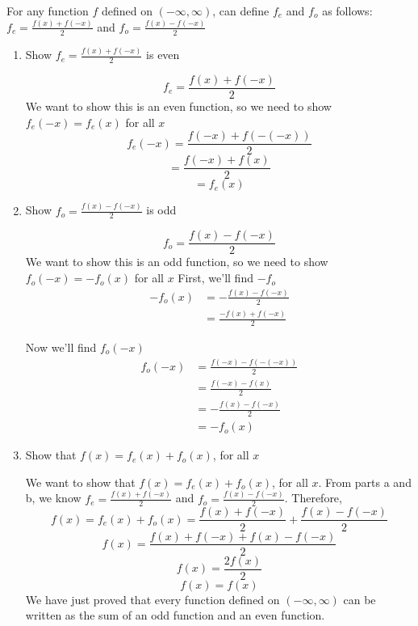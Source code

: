 \documentclass[nooutcomes, noinstructornotes]{ximera}
\begin{document}
\begin{problem}
For any function $f$ defined on $(-\infty,\infty)$, can define $f_e$ and $f_o$ as follows: $f_e=\frac{f(x)+f(-x)}{2}$ and $f_o=\frac{f(x)-f(-x)}{2}$


\begin{enumerate}	
	\item  Show  $f_e=\frac{f(x)+f(-x)}{2}$  is even
		\begin{freeResponse}	
			 $$f_e=\frac{f(x)+f(-x)}{2}$$
			We want to show this is an even function, so we need to show $f_e(-x)=f_e(x)$ for all $x$
			$$f_e(-x)=\frac{f(-x)+f(-(-x))}{2}$$ 
			$$=\frac{f(-x)+f(x)}{2}$$
			$$=f_e(x)$$
		\end{freeResponse}

	\item  Show $f_o=\frac{f(x)-f(-x)}{2}$ is odd
		\begin{freeResponse}	
			 $$f_o=\frac{f(x)-f(-x)}{2}$$
			We want to show this is an odd function, so we need to show $f_o(-x)=-f_o(x)$ for all $x$
			First, we'll find $-f_o$
			\begin{align*}
			-f_o(x)&=-\frac{f(x)-f(-x)}{2}\\
			&=\frac{-f(x)+f(-x)}{2}
			\end{align*}

			Now we'll find $f_o(-x)$
			\begin{align*}
			f_o(-x)&=\frac{f(-x)-f(-(-x))}{2}\\
			&=\frac{f(-x)-f(x)}{2}\\
			&=-\frac{f(x)-f(-x)}{2}\\
			&=-f_o(x)
			\end{align*}
			
		\end{freeResponse}
	\item Show that $f(x)=f_e(x)+f_o(x)$, for all $x$
		\begin{freeResponse}
		
		We want to show that $f(x)=f_e(x)+f_o(x)$, for all $x$.  From parts a and b, we know $f_e=\frac{f(x)+f(-x)}{2}$ and $f_o=\frac{f(x)-f(-x)}{2}$.  Therefore,
			$$f(x)=f_e(x)+f_o(x)=\frac{f(x)+f(-x)}{2}+\frac{f(x)-f(-x)}{2}$$
			$$f(x)=\frac{f(x)+f(-x)+f(x)-f(-x)}{2}$$
			$$f(x)=\frac{2f(x)}{2}$$
			$$f(x)=f(x)$$
		We have just proved that every function defined on $(-\infty,\infty)$ can be written as the sum of an odd function and an even function.
	
		\end{freeResponse}	
	\end{enumerate}
	

\end{problem}

\begin{instructorNotes}

\end{instructorNotes}
\end{document}
